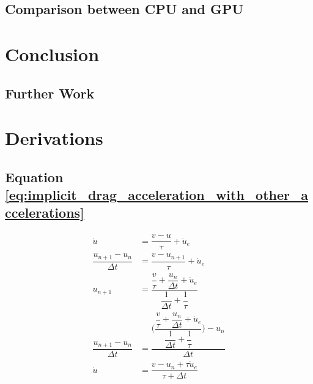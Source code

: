 \documentclass[10pt,a4paper,titlepage]{report}
\begin{document}
\section{Comparison between CPU and GPU}
\chapter{Conclusion}
\section{Further Work}
\appendix
\chapter{Derivations}
\section{Equation \ref{eq:implicit_drag_acceleration_with_other_accelerations}}
\label{sec:implicit_drag_accel_derivation}
\begin{align}
\dot{u} &= \dfrac{v - u}{\tau} + \dot{u}_{e}
\\\dfrac{u_{n+1} - u_{n}}{\Delta t} &= \dfrac{v - u_{n+1}}{\tau} + \dot{u}_{e}
\\u_{n+1} &= \dfrac{\dfrac{v}{\tau} + \dfrac{u_{n}}{\Delta t} + \dot{u}_{e}}{\dfrac{1}{\Delta t} + \dfrac{1}{\tau}}
\\\dfrac{u_{n+1} - u_{n}}{\Delta t} &= \dfrac{\Bigg(\dfrac{\dfrac{v}{\tau} + \dfrac{u_{n}}{\Delta t} + \dot{u}_{e}}{\dfrac{1}{\Delta t} + \dfrac{1}{\tau}}\Bigg) - u_{n}}{\Delta t}
\\\dot{u} &= \dfrac{v - u_{n} + \tau \dot{u}_{e}}{\tau + \Delta t}
\end{align}


\end{document}
